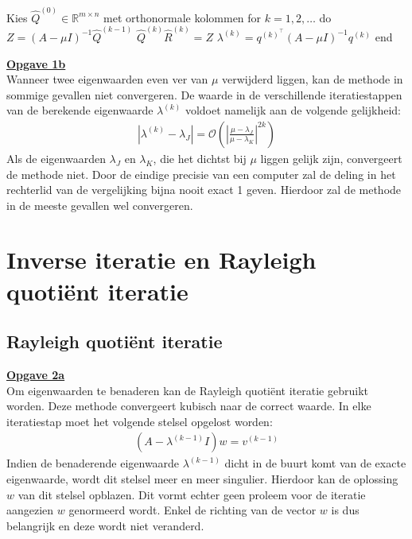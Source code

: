 \documentclass[a4paper, 12pt, titlepage, fleqn]{article}
\begin{document}
\begin{algorithm}[caption={Gelijktijdige iteratie}, label={alg:gelijktijdige iteratie}]
Kies $\hat{Q}^{(0)} \in \mathbb{R}^{m\times n}$ met orthonormale kolommen
for $k = 1,2,\ldots$ do
	$Z = (A-\mu I)^{-1}\hat{Q}^{(k-1)}$
	$\hat{Q}^{(k)}\hat{R}^{(k)} = Z$
	$\lambda^{(k)} = q^{(k)^\intercal}(A -\mu I)^{-1}q^{(k)}$
end
\end{algorithm}

\underline{\textbf{Opgave 1b}}\\

Wanneer twee eigenwaarden even ver van $\mu$ verwijderd liggen, kan de methode in sommige gevallen niet convergeren. De waarde in de verschillende iteratiestappen van de berekende eigenwaarde $\lambda^{(k)}$ voldoet namelijk aan de volgende gelijkheid:
\begin{align*}
|\lambda^{(k)} - \lambda_J| = \mathcal{O}\left(\left|\frac{\mu - \lambda_J}{\mu - \lambda_K}\right|^{2k}\right)
\end{align*} 
Als de eigenwaarden $\lambda_J$ en $\lambda_K$, die het dichtst bij $\mu$ liggen gelijk zijn, convergeert de methode niet. Door de eindige precisie van een computer zal de deling in het rechterlid van de vergelijking bijna nooit exact 1 geven. Hierdoor zal de methode in de meeste gevallen wel convergeren.

\section{Inverse iteratie en Rayleigh quoti\"ent iteratie}\label{sec:inverse iteratie}
\subsection{Rayleigh quoti\"ent iteratie}
\underline{\textbf{Opgave 2a}}\\

Om eigenwaarden te benaderen kan de Rayleigh quoti\"ent iteratie gebruikt worden. Deze methode convergeert kubisch naar de correct waarde. In elke iteratiestap moet het volgende stelsel opgelost worden:
\begin{align*}
(A - \lambda^{(k-1)}I)w = v^{(k-1)}
\end{align*}
Indien de benaderende eigenwaarde $\lambda^{(k-1)}$ dicht in de buurt komt van de exacte eigenwaarde, wordt dit stelsel meer en meer singulier. Hierdoor kan de oplossing $w$ van dit stelsel opblazen. Dit vormt echter geen proleem voor de iteratie aangezien $w$ genormeerd wordt. Enkel de richting van de vector $w$ is dus belangrijk en deze wordt niet veranderd.\\
\end{document}
